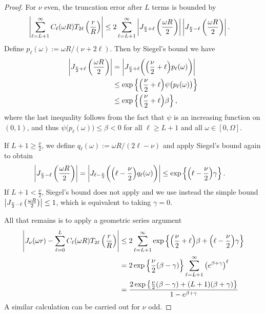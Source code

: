 \begin{proof}
    For $\nu$ even, the truncation error after $L$ terms is bounded by
    \begin{align}
        \left|\sum_{\ell=L+1}^\infty C_\ell(\omega R) T_{2\ell}\left( \frac{r}{R} \right)\right|
        &\leq 2\sum_{\ell=L+1}^\infty \left|J_{\frac{\nu}{2} + \ell}\left(\frac{\omega R}{2}\right)\right| \left|J_{\frac{\nu}{2} - \ell}\left(\frac{\omega R}{2}\right)\right|.
    \end{align}
    Define $p_\ell(\omega) := \omega R / (\nu + 2\ell)$. Then by Siegel's bound
    \cite[10.14.5]{olver2010nist} we have
    \begin{align}
        \left|J_{\frac{\nu}{2} + \ell}\left(\frac{\omega R}{2}\right)\right|
        &= \left|J_{\frac{\nu}{2} + \ell}\bigg(\Big(\frac{\nu}{2} + \ell\Big) p_\ell(\omega)\bigg)\right| \\
        &\leq \exp\left\{ \Big(\frac{\nu}{2} + \ell\Big) \psi\big(p_\ell(\omega)\big)\right\} \\
        &\leq \exp\left\{ \Big(\frac{\nu}{2} + \ell\Big) \beta \right\},
    \end{align}
    where the last inequality follows from the fact that $\psi$ is an increasing
    function on $(0,1)$, and thus $\psi\big(p_\ell(\omega)\big) \leq \beta < 0$
    for all $\ell \geq L+1$ and all $\omega \in [0, \Omega]$. 
    
    If $L+1 \geq \frac{\nu}{2}$, we define $q_\ell(\omega) := \omega R / (2\ell
    - \nu)$ and apply Siegel's bound again to obtain
    \begin{align}
        \left|J_{\frac{\nu}{2} - \ell}\left(\frac{\omega R}{2}\right)\right|
        &= \left|J_{\ell - \frac{\nu}{2}}\bigg(\Big(\ell - \frac{\nu}{2}\Big) q_\ell(\omega)\bigg)\right| 
        \leq \exp\left\{ \Big(\ell - \frac{\nu}{2}\Big) \gamma \right\}.
    \end{align}
    If $L+1 < \frac{\nu}{2}$, Siegel's bound does not apply and we use instead
    the simple bound $\left|J_{\frac{\nu}{2} - \ell}\left(\frac{\omega
    R}{2}\right)\right| \leq 1$, which is equivalent to taking $\gamma = 0$. 

    All that remains is to apply a geometric series argument
    \begin{align}
        \left|J_\nu(\omega r) - \sum_{\ell=0}^L C_\ell(\omega R) T_{2\ell}\left( \frac{r}{R} \right)\right|
        &\leq 2\sum_{\ell=L+1}^\infty \exp\left\{ \Big(\frac{\nu}{2} + \ell\Big) \beta + \Big(\ell - \frac{\nu}{2}\Big) \gamma \right\} \\
        &= 2\exp\left\{\frac{\nu}{2}(\beta - \gamma)\right\} \sum_{\ell=L+1}^\infty \left( e^{\beta + \gamma} \right)^\ell \\
        &= \frac{2\exp\left\{ \frac{\nu}{2}(\beta - \gamma) + (L+1)(\beta + \gamma) \right\}}{1 - e^{\beta + \gamma}}
    \end{align}
    A similar calculation can be carried out for $\nu$ odd.
\end{proof}


